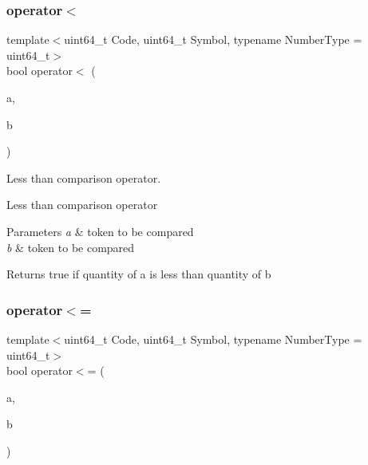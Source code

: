 \subsubsection{\texorpdfstring{operator$<$}{operator<}}
{\footnotesize\ttfamily template$<$uint64\+\_\+t Code, uint64\+\_\+t Symbol, typename Number\+Type  = uint64\+\_\+t$>$ \\
bool operator$<$ (\begin{DoxyParamCaption}\item[{const \mbox{\hyperlink{classaacio_1_1token}{token}}$<$ Code, Symbol, Number\+Type $>$ \&}]{a,  }\item[{const \mbox{\hyperlink{classaacio_1_1token}{token}}$<$ Code, Symbol, Number\+Type $>$ \&}]{b }\end{DoxyParamCaption})\hspace{0.3cm}{\ttfamily [friend]}}



Less than comparison operator. 

Less than comparison operator 
\begin{DoxyParams}{Parameters}
{\em a} & token to be compared \\
\hline
{\em b} & token to be compared \\
\hline
\end{DoxyParams}
\begin{DoxyReturn}{Returns}
true if quantity of a is less than quantity of b 
\end{DoxyReturn}
\mbox{\label{classaacio_1_1token_a6b52167a67ce0bac1f928747ce1247fb}} 
\subsubsection{\texorpdfstring{operator$<$=}{operator<=}}
{\footnotesize\ttfamily template$<$uint64\+\_\+t Code, uint64\+\_\+t Symbol, typename Number\+Type  = uint64\+\_\+t$>$ \\
bool operator$<$= (\begin{DoxyParamCaption}\item[{const \mbox{\hyperlink{classaacio_1_1token}{token}}$<$ Code, Symbol, Number\+Type $>$ \&}]{a,  }\item[{const \mbox{\hyperlink{classaacio_1_1token}{token}}$<$ Code, Symbol, Number\+Type $>$ \&}]{b }\end{DoxyParamCaption})\hspace{0.3cm}{\ttfamily [friend]}}



